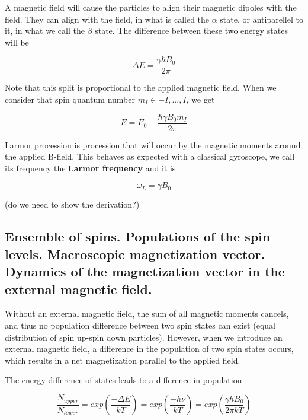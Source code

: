 \documentclass[12pt]{article}
\begin{document}
A magnetic field will cause the particles to align their magnetic dipoles with the field. They can align with the field, in what is called the $\alpha$ state, or antiparellel to it, in what we call the $\beta$ state. The difference between these two energy states will be

\[\Delta E = \frac{\gamma \hbar B_0}{2\pi} \]

Note that this split is proportional to the applied magnetic field. When we consider that spin quantum number $m_I \in {-I, ..., I}$, we get

\[E = E_0 - \frac{\hbar \gamma B_0 m_I}{2\pi}\]






Larmor procession is procession that will occur by the magnetic moments around the applied B-field. This behaves as expected with a classical gyroscope, we call its frequency the \textbf{Larmor frequency} and it is

\[ \omega_L = \gamma B_0\]

(do we need to show the derivation?)

\subsection{ Ensemble of spins. Populations of the spin levels. Macroscopic magnetization vector. Dynamics of the magnetization vector in the external magnetic field.}

Without an external magnetic field, the sum of all magnetic moments cancels, and thus no population difference between two spin states can exist (equal distribution of spin up-spin down particles). However, when we introduce an external magnetic field, a difference in the population of two spin states occurs, which results in a net magnetization parallel to the applied field.

The energy difference of states leads to a difference in population

\[\frac{N_{upper}}{N_{lower}} = exp({\frac{-\Delta E}{kT}}) = exp({\frac{-h \nu}{kT}}) = exp({\frac{\gamma h B_0}{2\pi kT}})\]

\end{document}
